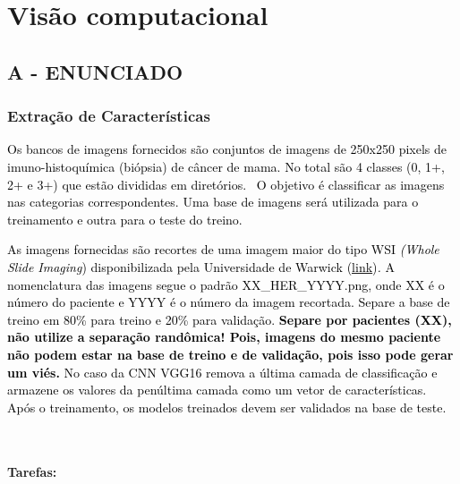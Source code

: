 \label{ap:ap11}
\chapter{Visão computacional}
\section*{\textbf{A - ENUNCIADO}}

\subsection{Extração de Características }

\textcolor{black}{Os bancos de imagens fornecidos são conjuntos de imagens de 250x250 pixels de imuno-histoquímica
(biópsia) de câncer de mama. No total são 4 classes (0, 1+, 2+ e 3+) que estão divididas em diretórios.  O objetivo é
classificar as imagens nas categorias correspondentes. Uma base de imagens será utilizada para o treinamento e outra
para o teste do treino.}\textcolor{black}{ }

\textcolor{black}{As imagens fornecidas são recortes de uma imagem maior do tipo WSI }\textit{\textcolor{black}{(Whole
Slide Imaging}}\textcolor{black}{) disponibilizada pela Universidade de Warwick
(}\underline{\href{https://pubmed.ncbi.nlm.nih.gov/28771788/}{\textcolor{black}{link}}}\textcolor{black}{)}\textit{\textcolor{black}{.}}\textcolor{black}{ A nomenclatura das imagens
segue o padrão XX\_HER\_YYYY.png, onde XX é o número do paciente e YYYY é o número da imagem recortada. Separe a base
de treino em 80\% para treino e 20\% para validação. }\textbf{\textcolor{black}{Separe por pacientes (XX), não utilize
a separação randômica! Pois, imagens do mesmo paciente não podem estar na base de treino e de validação, pois isso pode
gerar um viés.}}\textcolor{black}{ No caso da CNN VGG16 remova a última camada de classificação e armazene os valores
da penúltima camada como um vetor de características. Após o treinamento, os modelos treinados devem ser validados na
base de teste.}\textcolor{black}{ }

\textcolor{black}{ }

\subsubsection*{Tarefas:}

